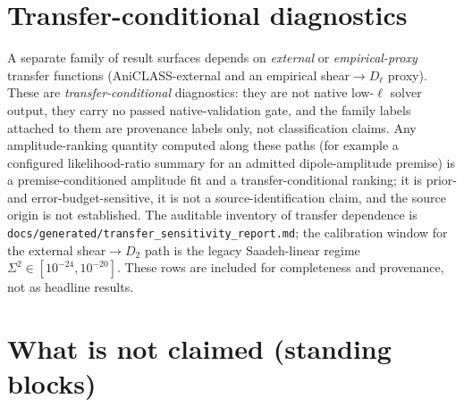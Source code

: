 \documentclass[11pt,a4paper]{article}
\theoremstyle{plain}
\theoremstyle{definition}
\begin{document}
\section{Transfer-conditional diagnostics}
\label{sec:transfer}

A separate family of result surfaces depends on \emph{external} or
\emph{empirical-proxy} transfer functions (AniCLASS-external and an
empirical shear$\to D_\ell$ proxy). These are \emph{transfer-conditional}
diagnostics: they are not native low-$\ell$ solver output, they carry
no passed native-validation gate, and the family labels attached to
them are provenance labels only, not classification claims. Any
amplitude-ranking quantity computed along these paths (for example a
configured likelihood-ratio summary for an admitted dipole-amplitude
premise) is a premise-conditioned amplitude fit and a
transfer-conditional ranking; it is prior- and
error-budget-sensitive, it is not a source-identification claim, and
the source origin is not established. The auditable inventory of
transfer dependence is
\texttt{docs/generated/transfer\_sensitivity\_report.md}; the
calibration window for the external shear$\to D_2$ path is the legacy
Saadeh-linear regime $\Sigma^2\in[10^{-24},10^{-20}]$. These rows are
included for completeness and provenance, not as headline results.

\section{What is not claimed (standing blocks)}
\label{sec:blocks}
\end{document}
